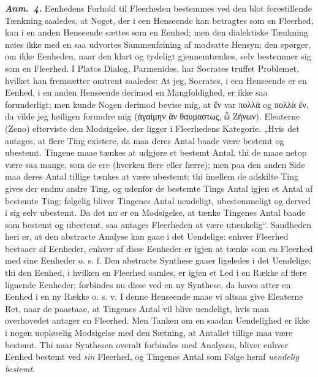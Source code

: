 \documentclass[12pt]{book}
\newcommand{\anm}[1]{\emph{\textbf{Anm.~#1.}}}
\newcommand{\opage}[1]{\marginnote{\footnotesize\textit{[#1]}}}
\begin{document}
\anm{4} Eenhedens Forhold til Fleerheden bestemmes ved den blot forestillende
Tænkning saaledes, at Noget, der i een Henseende kan betragtes som en
Fleerhed, kan i en anden Henseende sættes som en Eenhed; men den dialektiske
Tænkning nøies ikke med en saa udvortes Sammenføining af modsatte Hensyn; den
spørger, om ikke Eenheden, naar den klart og tydeligt gjennemtænkes, selv
bestemmer sig som en Fleerhed. I Platos Dialog, Parmenides, har Socrates
truffet Problemet, hvilket han fremsætter omtrent saaledes: At jeg, Socrates,
i een Henseende er en Eenhed, i en anden Henseende derimod en Mangfoldighed,
er ikke saa forunderligt; men kunde Nogen derimod bevise mig, at ἕν var πολλὰ
og πολλὰ ἕν, da vilde jeg høiligen forundre mig (ἀγαίμην ἂν θαυμαστως, ὦ
Ζήνων). Eleaterne (Zeno) efterviste den Modsigelse, der ligger i Fleerhedens
Kategorie. „Hvis det antages, at flere Ting existere, da maa deres Antal baade
være bestemt og ubestemt. Tingene maae tænkes at udgjøre et bestemt Antal, thi
de maae netop være saa mange, som de ere (hverken flere eller færre); men paa
den anden Side maa deres Antal tillige tænkes at være ubestemt; thi imellem de
adskilte Ting gives der endnu andre Ting, og udenfor de bestemte Tings Antal
igjen et Antal af bestemte Ting; følgelig bliver Tingenes Antal uendeligt,
ubestemmeligt og derved i sig selv ubestemt. Da det nu er en Modsigelse, at
tænke Tingenes Antal baade som bestemt
\opage{13} og ubestemt, saa antages Fleerheden at være utænkelig“. Sandheden heri er, at
den abstracte Analyse kan gaae i det Uendelige: enhver Fleerhed bestaaer af
Eenheder, enhver af disse Eenheder er igjen at tænke som en Fleerhed med sine
Eenheder o. s. f. Den abstracte Synthese gaaer ligeledes i det Uendelige; thi
den Eenhed, i hvilken en Fleerhed samles, er igjen et Led i en Række af flere
lignende Eenheder; forbindes nu disse ved en ny Synthese, da haves atter en
Eenhed i en ny Række o. s. v. I denne Henseende maae vi altsaa give Eleaterne
Ret, naar de paastaae, at Tingenes Antal vil blive uendeligt, hvis man
overhovedet antager en Fleerhed. Men Tanken om en saadan Uendelighed er ikke i
nogen uopløselig Modsigelse med den Sætning, at Antallet tillige maa være
bestemt. Thi naar Synthesen overalt forbindes med Analysen, bliver enhver
Eenhed bestemt ved \emph{sin} Fleerhed, og Tingenes Antal som Følge heraf
\emph{uendelig bestemt}.
\end{document}
